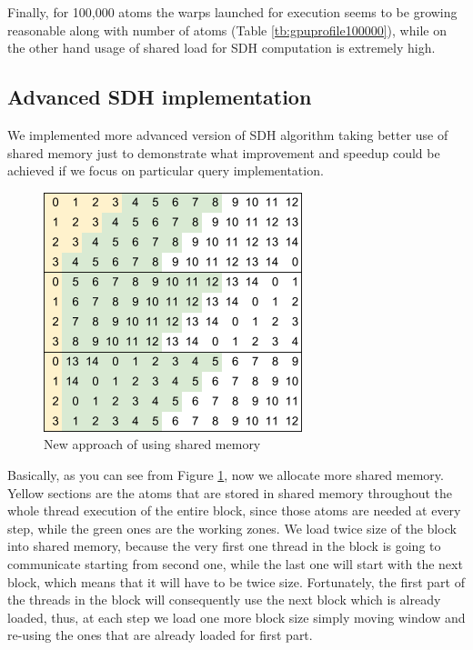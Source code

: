 \documentclass[11pt,a4paper]{report}
\begin{document}
Finally, for 100,000 atoms the warps launched for execution seems to be growing reasonable along with number of atoms (Table \ref{tb:gpuprofile100000}), while on the other hand usage of shared load for SDH computation is extremely high.

\subsection{Advanced SDH implementation}

We implemented more advanced version of SDH algorithm taking better use of shared memory just to demonstrate what improvement and speedup could be achieved if we focus on particular query implementation.

\begin{figure}
 \centerline{ \includegraphics[width=0.3\columnwidth]{images/improved_sdh}}
 \caption{New approach of using shared memory}
 \label{fg:improved_sdh}
\end{figure}

Basically, as you can see from Figure \ref{fg:improved_sdh}, now we allocate more shared memory. Yellow sections are the atoms that are stored in shared memory throughout the whole thread execution of the entire block, since those atoms are needed at every step, while the green ones are the working zones. We load twice size of the block into shared memory, because the very first one thread in the block is going to communicate starting from second one, while the last one will start with the next block, which means that it will have to be twice size. Fortunately, the first part of the threads in the block will consequently use the next block which is already loaded, thus, at each step we load one more block size simply moving window and re-using the ones that are already loaded for first part.
\end{document}
